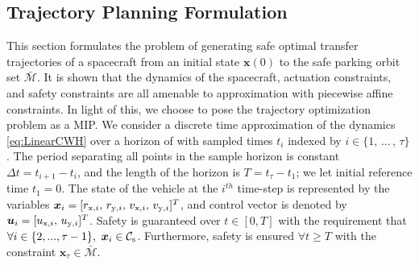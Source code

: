 \documentclass[twocolumn,letterpaper]{IEEEAerospaceCLS}  %
\theoremstyle{definition}
\begin{document}
\subsection{Trajectory Planning Formulation} \label{sec: trajectory planning formulation}
This section formulates the problem of generating safe optimal transfer trajectories of a spacecraft from an initial state $\boldsymbol{x}(0)$ to the safe parking orbit set $ \bar{{\mathcal{M}}}$. 
It is shown that the dynamics of the spacecraft, actuation constraints, and safety constraints are all amenable to approximation with piecewise affine constraints.
In light of this, we choose to pose the trajectory optimization problem as a MIP. 
We consider a discrete time approximation of the dynamics \eqref{eq:LinearCWH} over a horizon of with sampled times $t_i$ indexed by $i\in \{1,\,...\,,\,\tau\}$. The period separating all points in the sample horizon is constant $\Delta t = t_{i+1}-t_i$, and the length of the horizon is $T = t_\tau - t_1 $; we let initial reference time $t_1=0$. 
The state of the vehicle at the $i^{th}$ time-step is represented by the variables $\boldsymbol{x}_i = [r_{{\rm x},{i}}, \, r_{{\rm y},{i}}, \, v_{{\rm x},{i}}, \, v_{{\rm y},{i}} ]^T$, and control vector is denoted by $\boldsymbol{u}_i = [u_{{\rm x},i}, \, u_{{\rm y},i}]^T$. 
Safety is guaranteed over $t\in[0,T]$ with the requirement that $\forall i\in \{2,...,\tau-1\}, \,\, \boldsymbol{x}_i\in{\mathcal{C}}_{\rm s} $. 
Furthermore, safety is ensured $\forall t \geq T$ with the constraint $\boldsymbol{x}_\tau \in \bar{{\mathcal{M}}}$.


\end{document}
